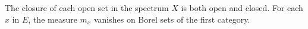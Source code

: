 The closure of each open set in the spectrum $X$ is both open and closed. For each $x$ in $E$, the measure $m_x$ vanishes on Borel sets of the first category.
